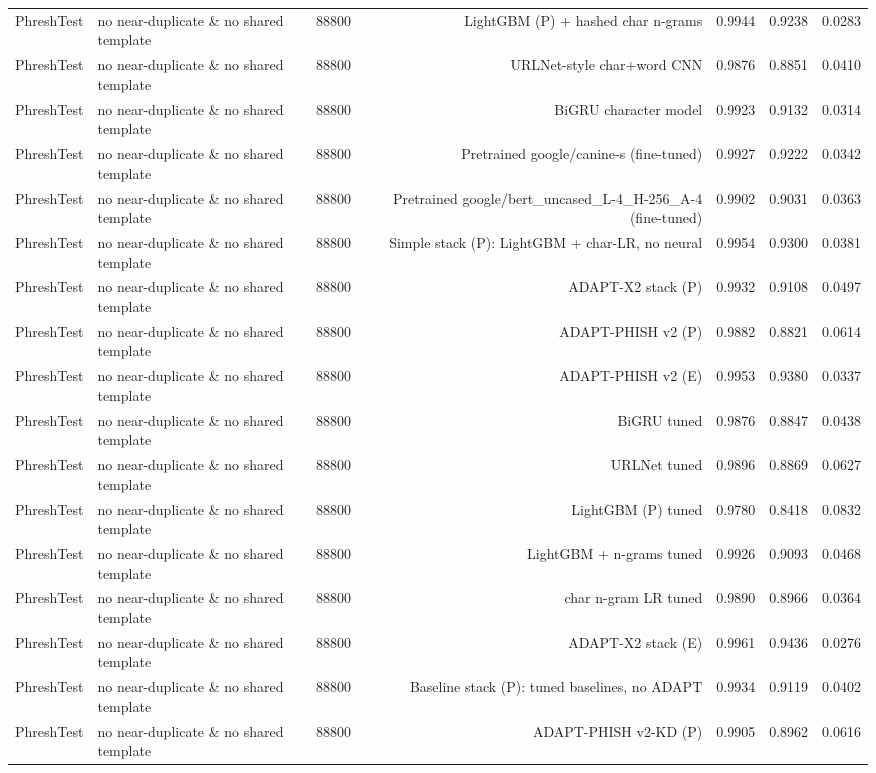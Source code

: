 \begin{table}[t]
\begin{tabular}{llrrrrr}
PhreshTest & no near-duplicate \& no shared template & 88800 & LightGBM (P) + hashed char n-grams & 0.9944 & 0.9238 & 0.0283 \\
PhreshTest & no near-duplicate \& no shared template & 88800 & URLNet-style char+word CNN & 0.9876 & 0.8851 & 0.0410 \\
PhreshTest & no near-duplicate \& no shared template & 88800 & BiGRU character model & 0.9923 & 0.9132 & 0.0314 \\
PhreshTest & no near-duplicate \& no shared template & 88800 & Pretrained google/canine-s (fine-tuned) & 0.9927 & 0.9222 & 0.0342 \\
PhreshTest & no near-duplicate \& no shared template & 88800 & Pretrained google/bert\_uncased\_L-4\_H-256\_A-4 (fine-tuned) & 0.9902 & 0.9031 & 0.0363 \\
PhreshTest & no near-duplicate \& no shared template & 88800 & Simple stack (P): LightGBM + char-LR, no neural & 0.9954 & 0.9300 & 0.0381 \\
PhreshTest & no near-duplicate \& no shared template & 88800 & ADAPT-X2 stack (P) & 0.9932 & 0.9108 & 0.0497 \\
PhreshTest & no near-duplicate \& no shared template & 88800 & ADAPT-PHISH v2 (P) & 0.9882 & 0.8821 & 0.0614 \\
PhreshTest & no near-duplicate \& no shared template & 88800 & ADAPT-PHISH v2 (E) & 0.9953 & 0.9380 & 0.0337 \\
PhreshTest & no near-duplicate \& no shared template & 88800 & BiGRU tuned & 0.9876 & 0.8847 & 0.0438 \\
PhreshTest & no near-duplicate \& no shared template & 88800 & URLNet tuned & 0.9896 & 0.8869 & 0.0627 \\
PhreshTest & no near-duplicate \& no shared template & 88800 & LightGBM (P) tuned & 0.9780 & 0.8418 & 0.0832 \\
PhreshTest & no near-duplicate \& no shared template & 88800 & LightGBM + n-grams tuned & 0.9926 & 0.9093 & 0.0468 \\
PhreshTest & no near-duplicate \& no shared template & 88800 & char n-gram LR tuned & 0.9890 & 0.8966 & 0.0364 \\
PhreshTest & no near-duplicate \& no shared template & 88800 & ADAPT-X2 stack (E) & 0.9961 & 0.9436 & 0.0276 \\
PhreshTest & no near-duplicate \& no shared template & 88800 & Baseline stack (P): tuned baselines, no ADAPT & 0.9934 & 0.9119 & 0.0402 \\
PhreshTest & no near-duplicate \& no shared template & 88800 & ADAPT-PHISH v2-KD (P) & 0.9905 & 0.8962 & 0.0616 \\

\end{tabular}
\end{table}
